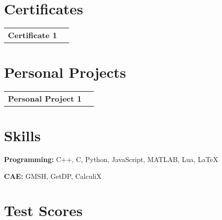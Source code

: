 \documentclass[10pt, a4paper]{article}
\begin{document}
    \section{Certificates}
    
        \begin{tabularx}{\textwidth}{K{0.2 cm} R{3.6 cm}}
            \textbf{Certificate 1}
            \vspace*{0.12 cm}
        &
            \end{tabularx}



    \section{Personal Projects}
    
        \begin{tabularx}{\textwidth}{K{0.2 cm} R{3.6 cm}}
            \textbf{Personal Project 1}
            \vspace*{0.12 cm}
        &
            \end{tabularx}



    \section{Skills}
    
            \setlength{\leftskip}{0.2 cm}
            \setlength{\rightskip}{0.2 cm}

            \textbf{Programming:} C++, C, Python, JavaScript, MATLAB, Lua, LaTeX

            \setlength{\leftskip}{0cm}
            \setlength{\rightskip}{0cm}

        \vspace*{0.12 cm}
        
            \setlength{\leftskip}{0.2 cm}
            \setlength{\rightskip}{0.2 cm}

            \textbf{CAE:} GMSH, GetDP, CalculiX

            \setlength{\leftskip}{0cm}
            \setlength{\rightskip}{0cm}



    \section{Test Scores}
    
            \setlength{\leftskip}{0.2 cm}
            \setlength{\rightskip}{0.2 cm}
\end{document}
